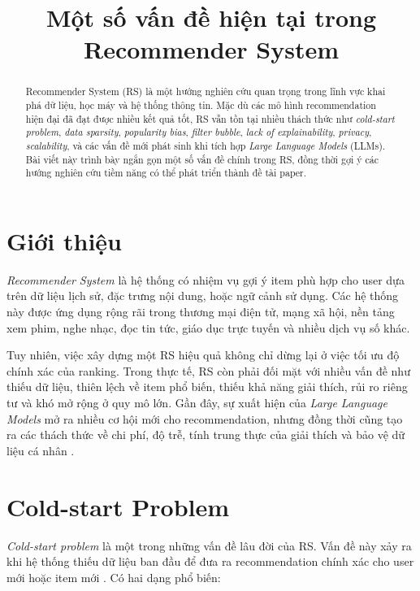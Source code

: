 \documentclass[12pt,a4paper]{article}
\title{\textbf{Một số vấn đề hiện tại trong Recommender System}}
\author{ }
\date{ }
\begin{document}
\maketitle

\begin{abstract}
Recommender System (RS) là một hướng nghiên cứu quan trọng trong lĩnh vực khai phá dữ liệu, học máy và hệ thống thông tin. 
Mặc dù các mô hình recommendation hiện đại đã đạt được nhiều kết quả tốt, RS vẫn tồn tại nhiều thách thức như \textit{cold-start problem}, \textit{data sparsity}, \textit{popularity bias}, \textit{filter bubble}, \textit{lack of explainability}, \textit{privacy}, \textit{scalability}, và các vấn đề mới phát sinh khi tích hợp \textit{Large Language Models} (LLMs). 
Bài viết này trình bày ngắn gọn một số vấn đề chính trong RS, đồng thời gợi ý các hướng nghiên cứu tiềm năng có thể phát triển thành đề tài paper.
\end{abstract}

\section{Giới thiệu}

\textit{Recommender System} là hệ thống có nhiệm vụ gợi ý item phù hợp cho user dựa trên dữ liệu lịch sử, đặc trưng nội dung, hoặc ngữ cảnh sử dụng. 
Các hệ thống này được ứng dụng rộng rãi trong thương mại điện tử, mạng xã hội, nền tảng xem phim, nghe nhạc, đọc tin tức, giáo dục trực tuyến và nhiều dịch vụ số khác.

Tuy nhiên, việc xây dựng một RS hiệu quả không chỉ dừng lại ở việc tối ưu độ chính xác của ranking. 
Trong thực tế, RS còn phải đối mặt với nhiều vấn đề như thiếu dữ liệu, thiên lệch về item phổ biến, thiếu khả năng giải thích, rủi ro riêng tư và khó mở rộng ở quy mô lớn. 
Gần đây, sự xuất hiện của \textit{Large Language Models} mở ra nhiều cơ hội mới cho recommendation, nhưng đồng thời cũng tạo ra các thách thức về chi phí, độ trễ, tính trung thực của giải thích và bảo vệ dữ liệu cá nhân \cite{wu2024llmrec,fan2024llmrec}.

\section{Cold-start Problem}

\textit{Cold-start problem} là một trong những vấn đề lâu đời của RS. 
Vấn đề này xảy ra khi hệ thống thiếu dữ liệu ban đầu để đưa ra recommendation chính xác cho user mới hoặc item mới \cite{zhang2025coldstart}. 
Có hai dạng phổ biến:
\end{document}
